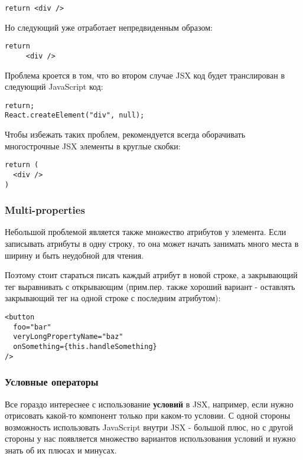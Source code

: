 \documentclass[12pt]{book}
\begin{document}
\begin{lstlisting}
return <div />
\end{lstlisting}

Но следующий уже отработает непредвиденным образом:

\begin{lstlisting}
return
     <div />
\end{lstlisting}
     
Проблема кроется в том, что во втором случае JSX код будет транслирован в следующий JavaScript код:

\begin{lstlisting}
return;
React.createElement("div", null);
\end{lstlisting}
   
Чтобы избежать таких проблем, рекомендуется всегда оборачивать многострочные JSX элементы в круглые скобки:

\begin{lstlisting}
return (
  <div />
)
\end{lstlisting}

\subsubsection*{Multi-properties}

Небольшой проблемой является также множество атрибутов у элемента. Если записывать атрибуты в одну строку, то она может начать занимать много места в ширину и быть неудобной для чтения. 

Поэтому стоит стараться писать каждый атрибут в новой строке, а закрывающий тег выравнивать с открывающим (прим.пер. также хороший вариант - оставлять закрывающий тег на одной строке с последним атрибутом):

\begin{lstlisting}
<button
  foo="bar"
  veryLongPropertyName="baz"
  onSomething={this.handleSomething}
/>
\end{lstlisting}

\subsubsection*{Условные операторы}

Все гораздо интереснее с использование \textbf{условий} в JSX, например, если нужно отрисовать какой-то компонент только при каком-то условии. С одной стороны возможность использовать JavaScript внутри JSX - большой плюс, но с другой стороны у нас появляется множество вариантов использования условий и нужно знать об их плюсах и минусах.
\end{document}
